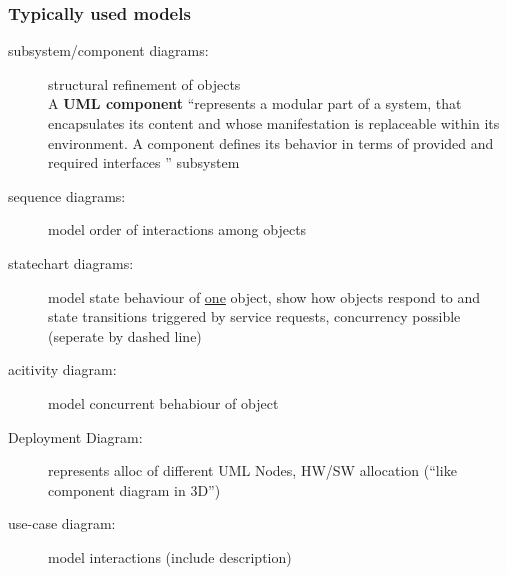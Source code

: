\documentclass[a4paper, 10pt]{article}
\begin{document}
\subsubsection{Typically used models}
\begin{description}
	\item[subsystem/component diagrams:] structural refinement of objects \\
	A \textbf{UML component} ``represents a modular part of a system, that encapsulates its content and whose manifestation is replaceable within its environment. A component defines its behavior in terms of provided and required interfaces
'' \follows subsystem \\
	
	\item[sequence diagrams:] model order of interactions among objects\\
	
	\item[statechart diagrams:] model state behaviour of \underline{one} object, show how objects respond to and state transitions triggered by service requests, concurrency possible (seperate by dashed line) \\
	
	\item[acitivity diagram:] model concurrent behabiour of object
	\item [Deployment Diagram:] represents alloc of different UML Nodes, HW/SW allocation (``like component diagram in 3D'')
	\item[use-case diagram:] model interactions (include description)
\end{description}
\end{document}
